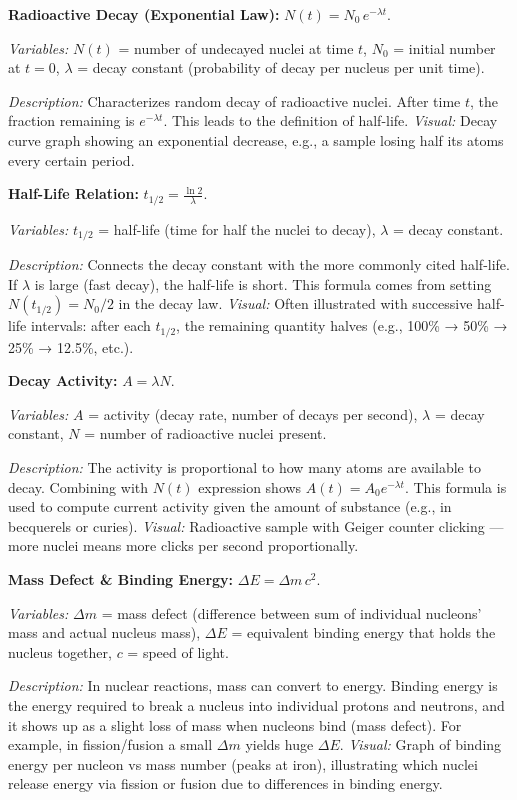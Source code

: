 \documentclass{article}
\begin{document}
\textbf{Radioactive Decay (Exponential Law):} $N(t) = N_0\, e^{-\lambda t}$.

\textit{Variables:} $N(t)$ = number of undecayed nuclei at time $t$, $N_0$ = initial number at $t=0$, $\lambda$ = decay constant (probability of decay per nucleus per unit time).

\textit{Description:} Characterizes random decay of radioactive nuclei. After time $t$, the fraction remaining is $e^{-\lambda t}$. This leads to the definition of half-life. \textit{Visual:} Decay curve graph showing an exponential decrease, e.g., a sample losing half its atoms every certain period.

\textbf{Half-Life Relation:} $t_{1/2} = \frac{\ln 2}{\lambda}$.

\textit{Variables:} $t_{1/2}$ = half-life (time for half the nuclei to decay), $\lambda$ = decay constant.

\textit{Description:} Connects the decay constant with the more commonly cited half-life. If $\lambda$ is large (fast decay), the half-life is short. This formula comes from setting $N(t_{1/2}) = N_0/2$ in the decay law. \textit{Visual:} Often illustrated with successive half-life intervals: after each $t_{1/2}$, the remaining quantity halves (e.g., 100\% → 50\% → 25\% → 12.5\%, etc.).

\textbf{Decay Activity:} $A = \lambda N$.

\textit{Variables:} $A$ = activity (decay rate, number of decays per second), $\lambda$ = decay constant, $N$ = number of radioactive nuclei present.

\textit{Description:} The activity is proportional to how many atoms are available to decay. Combining with $N(t)$ expression shows $A(t) = A_0 e^{-\lambda t}$. This formula is used to compute current activity given the amount of substance (e.g., in becquerels or curies). \textit{Visual:} Radioactive sample with Geiger counter clicking — more nuclei means more clicks per second proportionally.

\textbf{Mass Defect \& Binding Energy:} $\Delta E = \Delta m\,c^2$.

\textit{Variables:} $\Delta m$ = mass defect (difference between sum of individual nucleons’ mass and actual nucleus mass), $\Delta E$ = equivalent binding energy that holds the nucleus together, $c$ = speed of light.

\textit{Description:} In nuclear reactions, mass can convert to energy. Binding energy is the energy required to break a nucleus into individual protons and neutrons, and it shows up as a slight loss of mass when nucleons bind (mass defect). For example, in fission/fusion a small $\Delta m$ yields huge $\Delta E$. \textit{Visual:} Graph of binding energy per nucleon vs mass number (peaks at iron), illustrating which nuclei release energy via fission or fusion due to differences in binding energy.
\end{document}
